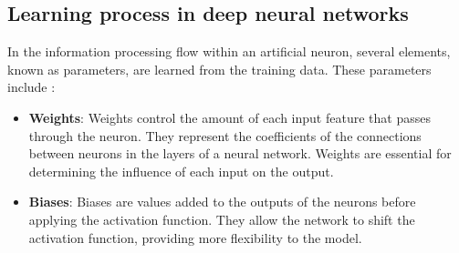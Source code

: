 


    
\subsection{Learning process in deep neural networks}

In the information processing flow within an artificial neuron, several elements, known as parameters, are learned from the training data. These parameters include \parencite{Kelleher2019}:
\begin{itemize}
    \item \textbf{Weights}: Weights control the amount of each input feature that passes through the neuron. They represent the coefficients of the connections between neurons in the layers of a neural network. Weights are essential for determining the influence of each input on the output.
    
    \item \textbf{Biases}: Biases are values added to the outputs of the neurons before applying the activation function. They allow the network to shift the activation function, providing more flexibility to the model.
\end{itemize}

